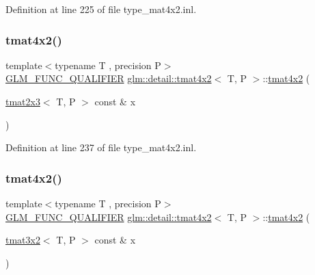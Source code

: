 Definition at line 225 of file type\+\_\+mat4x2.\+inl.

\mbox{\label{structglm_1_1detail_1_1tmat4x2_af72c0575d3315a1a7b434dabcefea5aa}} 
\subsubsection{\texorpdfstring{tmat4x2()}{tmat4x2()}\hspace{0.1cm}{\footnotesize\ttfamily [14/22]}}
{\footnotesize\ttfamily template$<$typename T , precision P$>$ \\
\hyperlink{setup_8hpp_a33fdea6f91c5f834105f7415e2a64407}{G\+L\+M\+\_\+\+F\+U\+N\+C\+\_\+\+Q\+U\+A\+L\+I\+F\+I\+ER} \hyperlink{structglm_1_1detail_1_1tmat4x2}{glm\+::detail\+::tmat4x2}$<$ T, P $>$\+::\hyperlink{structglm_1_1detail_1_1tmat4x2}{tmat4x2} (\begin{DoxyParamCaption}\item[{\hyperlink{structglm_1_1detail_1_1tmat2x3}{tmat2x3}$<$ T, P $>$ const \&}]{x }\end{DoxyParamCaption})\hspace{0.3cm}{\ttfamily [explicit]}}



Definition at line 237 of file type\+\_\+mat4x2.\+inl.

\mbox{\label{structglm_1_1detail_1_1tmat4x2_adbb464ba1329c45ae931b2825114d6cf}} 
\subsubsection{\texorpdfstring{tmat4x2()}{tmat4x2()}\hspace{0.1cm}{\footnotesize\ttfamily [15/22]}}
{\footnotesize\ttfamily template$<$typename T , precision P$>$ \\
\hyperlink{setup_8hpp_a33fdea6f91c5f834105f7415e2a64407}{G\+L\+M\+\_\+\+F\+U\+N\+C\+\_\+\+Q\+U\+A\+L\+I\+F\+I\+ER} \hyperlink{structglm_1_1detail_1_1tmat4x2}{glm\+::detail\+::tmat4x2}$<$ T, P $>$\+::\hyperlink{structglm_1_1detail_1_1tmat4x2}{tmat4x2} (\begin{DoxyParamCaption}\item[{\hyperlink{structglm_1_1detail_1_1tmat3x2}{tmat3x2}$<$ T, P $>$ const \&}]{x }\end{DoxyParamCaption})\hspace{0.3cm}{\ttfamily [explicit]}}



